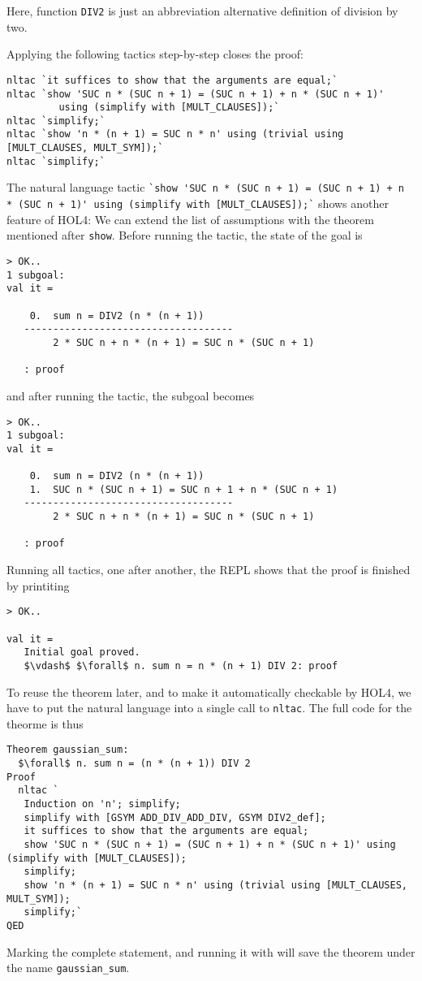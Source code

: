 Here, function \lstinline{DIV2} is just an abbreviation alternative definition
of division by two.

Applying the following tactics step-by-step closes the proof:

\begin{lstlisting}
nltac `it suffices to show that the arguments are equal;`
nltac `show 'SUC n * (SUC n + 1) = (SUC n + 1) + n * (SUC n + 1)'
         using (simplify with [MULT_CLAUSES]);`
nltac `simplify;`
nltac `show 'n * (n + 1) = SUC n * n' using (trivial using [MULT_CLAUSES, MULT_SYM]);`
nltac `simplify;`
\end{lstlisting}

\begin{sloppypar}
The natural language tactic \lstinline{`show 'SUC n * (SUC n + 1) = (SUC n + 1) + n * (SUC n + 1)' using (simplify with [MULT_CLAUSES]);`}
shows another feature of HOL4:
We can extend the list of assumptions with the theorem mentioned after
\lstinline{show}.
Before running the tactic, the state of the goal is
\end{sloppypar}
\begin{lstlisting}
> OK..
1 subgoal:
val it =

    0.  sum n = DIV2 (n * (n + 1))
   ------------------------------------
        2 * SUC n + n * (n + 1) = SUC n * (SUC n + 1)

   : proof
\end{lstlisting}

and after running the tactic, the subgoal becomes
\begin{lstlisting}
> OK..
1 subgoal:
val it =

    0.  sum n = DIV2 (n * (n + 1))
    1.  SUC n * (SUC n + 1) = SUC n + 1 + n * (SUC n + 1)
   ------------------------------------
        2 * SUC n + n * (n + 1) = SUC n * (SUC n + 1)

   : proof
\end{lstlisting}

Running all tactics, one after another, the REPL shows that the proof is finished by printiting
\begin{lstlisting}
> OK..

val it =
   Initial goal proved.
   $\vdash$ $\forall$ n. sum n = n * (n + 1) DIV 2: proof
\end{lstlisting}

To reuse the theorem later, and to make it automatically checkable by HOL4, we
have to put the natural language into a single call to \lstinline{nltac}.
The full code for the theorme is thus
\begin{lstlisting}[mathescape=true]
Theorem gaussian_sum:
  $\forall$ n. sum n = (n * (n + 1)) DIV 2
Proof
  nltac `
   Induction on 'n'; simplify;
   simplify with [GSYM ADD_DIV_ADD_DIV, GSYM DIV2_def];
   it suffices to show that the arguments are equal;
   show 'SUC n * (SUC n + 1) = (SUC n + 1) + n * (SUC n + 1)' using (simplify with [MULT_CLAUSES]);
   simplify;
   show 'n * (n + 1) = SUC n * n' using (trivial using [MULT_CLAUSES, MULT_SYM]);
   simplify;`
QED
\end{lstlisting}

Marking the complete statement, and running it with  will save the
theorem under the name \lstinline{gaussian_sum}.